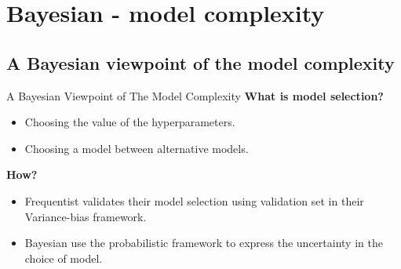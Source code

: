 \documentclass{bredelebeamer}
\begin{document}
\section{Bayesian - model complexity}
\subsection{A Bayesian viewpoint of the model complexity}
\begin{frame}{A Bayesian Viewpoint of The Model Complexity}
  \textbf{What is model selection?}
  \begin{itemize}
    \item Choosing the value of the hyperparameters.
    \item Choosing a model between alternative models.
  \end{itemize}

  \textbf{How?}
  \begin{itemize}
    \item Frequentist validates their model selection using validation set in
          their Variance-bias framework.
    \item Bayesian use the probabilistic framework to express the uncertainty in
          the choice of model.
  \end{itemize}
\end{frame}
\end{document}
